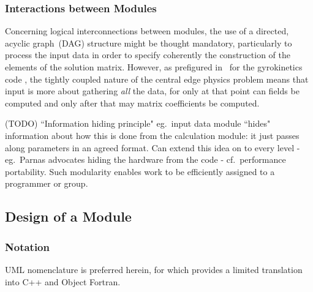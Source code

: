 \subsubsection{Interactions between Modules}\label{sec:TS_modulint}
Concerning logical interconnections between modules, the 
use of  a directed, acyclic graph~(DAG) structure might be thought mandatory,
particularly to  process the input
data in order to specify coherently the construction of the elements of the solution matrix.
However, as prefigured in~\cite{y2re333} for the gyrokinetics code ,
the tightly coupled nature of the central edge
physics problem  means that input is more about gathering \emph{all} the data, for only at that point
can fields be computed and only after that may matrix coefficients be computed.

(TODO) ``Information hiding principle" eg.\ input data module ``hides" information about how this is done from
the calculation module: it just passes along parameters in an agreed format.
Can extend this idea on to every level - eg.\ Parnas advocates hiding the hardware from the code -
cf.\  performance portability.
Such modularity  enables work to be efficiently  assigned to a programmer or group.

\subsection{Design of a Module}\label{sec:TS_lowlevel}
\subsubsection{Notation}

UML nomenclature is preferred herein, for which  provides a limited 
translation into C++ and Object Fortran. %

